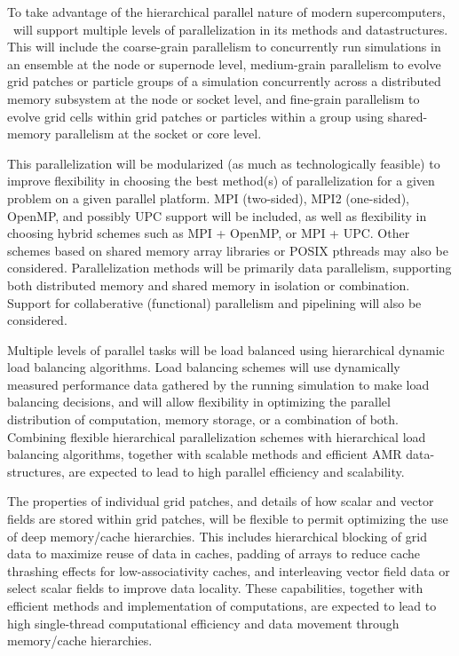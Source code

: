 \documentclass{article}[12pt]
\begin{document}
     To take advantage of the
   hierarchical parallel nature of modern supercomputers, \cello\ will
   support multiple levels of parallelization in its methods and
   datastructures.  This will include the coarse-grain parallelism to
   concurrently run simulations in an ensemble at the node or
   supernode level, medium-grain parallelism to evolve grid patches or
   particle groups of a simulation concurrently across a distributed
   memory subsystem at the node or socket level, and fine-grain parallelism to
   evolve grid cells within grid patches or particles within a group
   using shared-memory parallelism at the socket or core level.

     This parallelization will be
   modularized (as much as technologically feasible) to improve
   flexibility in choosing the best method(s) of parallelization for a
   given problem on a given parallel platform.  MPI (two-sided), MPI2
   (one-sided), OpenMP, and possibly UPC support will be included, as
   well as flexibility in choosing hybrid schemes such as MPI +
   OpenMP, or MPI + UPC.  Other schemes based on shared memory array
   libraries or POSIX pthreads may also be considered.
   Parallelization methods will be primarily data parallelism,
   supporting both distributed memory and shared memory in isolation
   or combination.  Support for collaberative (functional) parallelism
   and pipelining will also be considered.


     Multiple levels of parallel tasks
   will be load balanced using hierarchical dynamic load balancing
   algorithms.  Load balancing schemes will use dynamically measured
   performance data gathered by the running simulation to make load
   balancing decisions, and will allow flexibility in optimizing the
   parallel distribution of computation, memory storage, or a
   combination of both.  Combining flexible hierarchical
   parallelization schemes with hierarchical load balancing
   algorithms, together with scalable methods and efficient AMR
   data-structures, are expected to lead to high parallel efficiency
   and scalability.


%
   The properties of individual grid patches, and details of how
   scalar and vector fields are stored within grid patches, will be
   flexible to permit optimizing the use of deep memory/cache
   hierarchies.  This includes hierarchical blocking of grid data to
   maximize reuse of data in caches, padding of arrays to reduce cache
   thrashing effects for low-associativity caches, and interleaving
   vector field data or select scalar fields to improve data locality.
   These capabilities, together with efficient methods and
   implementation of computations, are expected to lead to high
   single-thread computational efficiency and data movement through
   memory/cache hierarchies.
\end{document}
